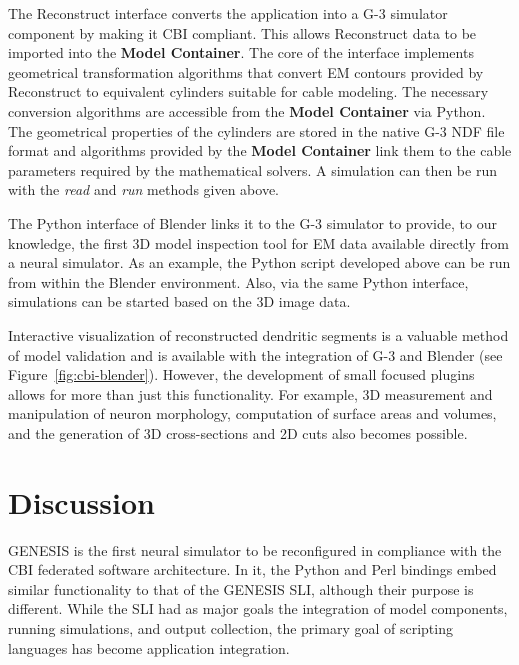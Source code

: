\documentclass[10pt]{article}
\begin{document}
The Reconstruct interface converts the application
into a G-3 simulator component by making it CBI compliant. This allows
Reconstruct data to be imported into the {\bf Model Container}.
The core of the interface implements geometrical transformation
algorithms that convert EM contours provided by Reconstruct to
equivalent cylinders suitable for cable modeling. The necessary conversion algorithms are accessible from the
{\bf Model Container} via Python.
The geometrical properties of the cylinders are stored in the native
G-3 NDF file format and algorithms provided by the {\bf Model Container}
link them to the cable parameters required by the mathematical
solvers.  A simulation can then be run with the {\it read} and {\it
  run} methods given above.

The Python interface of Blender links it to the G-3 simulator to
provide, to our knowledge, the first 3D model inspection tool for EM
data available directly from a neural simulator.  As an example, the
Python script developed above can be run from within the Blender
environment.  Also, via the same Python interface, simulations can be
started based on the 3D image data.

Interactive visualization of reconstructed dendritic segments is a
valuable method of model validation and is available with the
integration of G-3 and Blender (see Figure~\ref{fig:cbi-blender}).
However, the development of small focused plugins allows for more than
just this functionality. For example, 3D measurement and manipulation of
neuron morphology, computation of surface areas and volumes, and the
generation of 3D cross-sections and 2D cuts also becomes possible.

\section*{Discussion}

GENESIS is the first neural simulator to be reconfigured in compliance
with the CBI federated software architecture. In it, the Python and Perl bindings embed similar
functionality to that of the GENESIS SLI, although their purpose is different.
While the SLI had as major goals the integration of model components,
running simulations, and output collection, the primary goal of
scripting languages has become application
integration.
\end{document}
